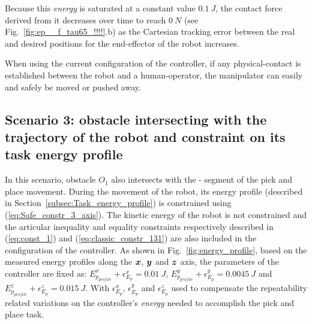 \documentclass[letterpaper, 10 pt, conference]{ieeeconf}      %
\newcommand*\circled[1]{\tikz[baseline=(char.base)]{
            \node[shape=circle,draw,inner sep=0.5pt] (char) {#1};}}
\newcommand{\vect}[1]{\mbox{\boldmath${#1}$}}%
\begin{document}
Because this \textit{energy} is saturated at a constant value $0.1~J$, the contact force derived from it decreases over time to reach $0~N$ (see Fig.~\ref{fig:ep__f_tau65_!!!!}.b) as the Cartesian tracking error between the real and desired positions for the end-effector of the robot increases. 

When using the current configuration of the controller, if any physical-contact is established between the robot and a human-operator, the manipulator can easily and safely be moved or pushed away.
\subsection{Scenario 3: obstacle intersecting with the trajectory of the robot and constraint on its task energy profile}
In this scenario, obstacle $O_1$ also intersects with the \circled{2}-\circled{3} segment of the pick and place movement. During the movement of the robot, its energy profile (described in Section~\ref{subsec:Task_energy_profile}) is constrained using (\ref{eq:Safe_constr_3_axis}). The kinetic energy of the robot is not constrained and the articular inequality and equality constraints respectively described in (\ref{eq:const_1}) and (\ref{eq:classic_constr_131}) are also included in the configuration of the controller. As shown in Fig.~\ref{fig:energy_profile}, based on the measured energy profiles along the $\vect{x}$, $\vect{y}$ and $\vect{z}$ axis, the  parameters of the controller are fixed as: $E_{p_{profile}}^{x}+\epsilon_{E_p}^{x} = 0.01~J$, $E_{p_{profile}}^{y}+\epsilon_{E_p}^{y} = 0.0045~J$ and $E_{p_{profile}}^{z}+\epsilon_{E_p}^{z} = 0.015~J$. With $\epsilon_{E_p}^{x}$, $\epsilon_{E_p}^{y}$ and $\epsilon_{E_p}^{z}$ used to compensate the repeatability related variations on the controller's \textit{energy} needed to accomplish the pick and place task.
\end{document}

